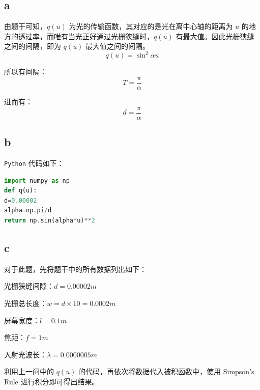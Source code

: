 \documentclass[UTF8]{ctexart}
\begin{document}
    \subsection{a}\label{subsec:section4.1}
    由题干可知，\(q(u)\) 为光的传输函数，其对应的是光在离中心轴的距离为 \(u\) 的地方的透过率，而唯有当光正好通过光栅狭缝时，\(q(u)\) 有最大值。因此光栅狭缝之间的间隔，即为 \(q(u)\) 最大值之间的间隔。
    \begin{equation*}
        q(u) = \sin^2 \alpha u
    \end{equation*}

    所以有间隔：
    \begin{equation*}
        T = \frac{\pi}{\alpha}
    \end{equation*}

    进而有：
    \begin{equation*}
        d = \frac{\pi}{\alpha}
    \end{equation*}

    \subsection{b}\label{subsec:section4.2}
    \texttt{Python} 代码如下：
    \begin{lstlisting}[language=Python, breaklines = true,label={lst:lstlisting1}]
import numpy as np
def q(u):
d=0.00002
alpha=np.pi/d
return np.sin(alpha*u)**2
    \end{lstlisting}

    \subsection{c}\label{subsec:section4.3}
    对于此题，先将题干中的所有数据列出如下：

    光栅狭缝间隙：\(d = 0.00002 m\)

    光栅总长度：\(w = d \times 10 = 0.0002 m\)

    屏幕宽度：\(l = 0.1 m\)

    焦距：\(f = 1 m\)

    入射光波长：\(\lambda = 0.0000005 m\)

    利用上一问中的 \(q(u)\) 的代码，再依次将数据代入被积函数中，使用 Simpson’s Rule 进行积分即可得出结果。
\end{document}

